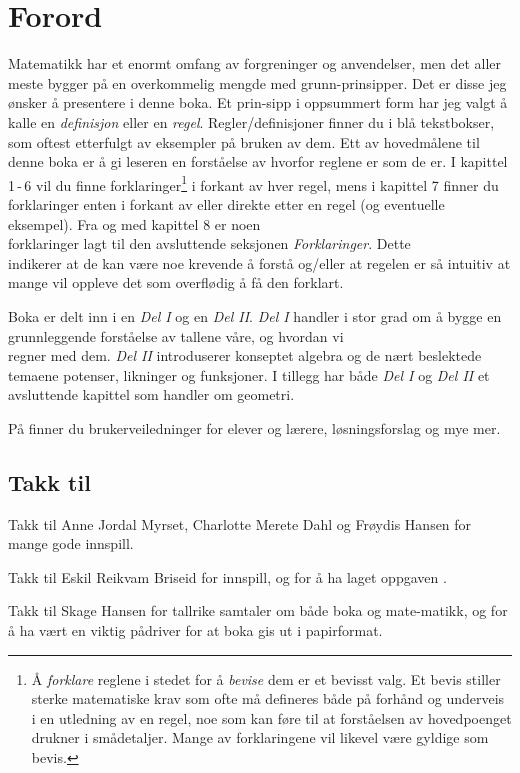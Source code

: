 




\section*{Forord}
Matematikk har et enormt omfang av forgreninger og anvendelser, men det aller meste bygger på en overkommelig mengde med grunn-prinsipper. Det er disse jeg ønsker å presentere i denne boka. Et prin-sipp i oppsummert form har jeg valgt å kalle en \textit{definisjon} eller en \textit{regel}. Regler/definisjoner finner du i blå tekstbokser, som oftest etterfulgt av eksempler på bruken av dem. Ett av hovedmålene til denne boka er å gi leseren en forståelse av hvorfor reglene er som de er. I kapittel 1\,-\,6 vil du finne forklaringer\footnote{Å \textsl{forklare} reglene i stedet for å \textsl{bevise} dem er et bevisst valg. Et bevis stiller sterke matematiske krav som ofte må defineres både på forhånd og underveis i en utledning av en regel, noe som kan føre til at forståelsen av hovedpoenget drukner i smådetaljer. Mange av forklaringene vil likevel være gyldige som bevis.} i forkant av hver regel, mens i kapittel 7 finner du forklaringer enten i forkant av eller direkte etter en regel (og eventuelle eksempel). Fra og med kapittel 8 er noen \\ forklaringer lagt til den avsluttende seksjonen \textit{Forklaringer}. Dette \\ indikerer at de kan være noe krevende å forstå og/eller at regelen er så intuitiv at mange vil oppleve det som overflødig å få den forklart. \vsk

Boka er delt inn i en \textsl{Del I} og en \textsl{Del II}. \textsl{Del I} handler i stor grad om å bygge en grunnleggende forståelse av tallene våre, og hvordan vi\\ regner med dem. \textsl{Del II} introduserer konseptet algebra og de nært beslektede temaene potenser, likninger og funksjoner. I tillegg har både \textsl{Del I} og \textsl{Del II} et avsluttende kapittel som handler om geometri. \vsk

På  finner du brukerveiledninger for elever og lærere, løsningsforslag og mye mer.\vsk \vsk


\subsection*{Takk til}
Takk til
Anne Jordal Myrset,
Charlotte Merete Dahl og
Frøydis Hansen for mange gode innspill. \vsk

Takk til Eskil Reikvam Briseid for innspill, og for å ha laget oppgaven . \vsk

Takk til Skage Hansen 
for tallrike samtaler om både boka og mate-matikk, og for å ha vært en viktig pådriver for at boka gis ut i papirformat.


